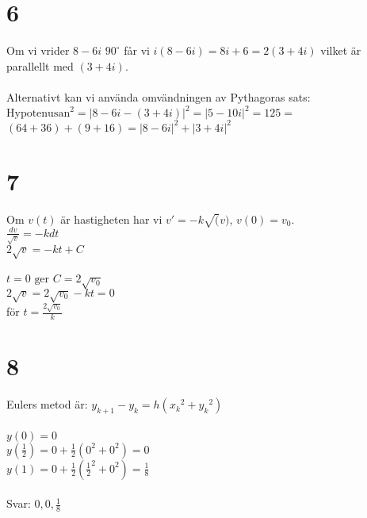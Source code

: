 \documentclass{article}
\begin{document}
\section*{6}
Om vi vrider $8-6i$ $90^{\circ}$ får vi $i(8-6i) = 8i+6 = 2(3+4i)$ vilket är 
parallellt med $(3+4i)$.\\\\
\noindent
Alternativt kan vi använda omvändningen av Pythagoras sats:\\
$\text{Hypotenusan}^2 = |8-6i - (3+4i)|^2 = |5-10i|^2 = 125 = $\\
$(64+36) + (9+16) = |8-6i|^2 + |3+4i|^2$

\section*{7}
Om $v(t)$ är hastigheten har vi $v' = -k \sqrt(v)$, $v(0) = v_0$.\\
$\frac{dv}{\sqrt{v}} = -k dt$\\
$2 \sqrt{v} = -kt + C$\\\\
$t=0 \text{ ger } C = 2\sqrt{v_0}$\\
$2\sqrt{v} = 2\sqrt{v_0} - kt = 0$\\
för $ t = \frac{2\sqrt{v_0}}{k}$\\

\section*{8}
Eulers metod är: $y_{k+1} - y_k = h({x_k}^2 + {y_k}^2)$\\\\
$y(0) = 0$\\
$y(\frac{1}{2}) = 0 + \frac{1}{2}(0^2 + 0^2) = 0$\\
$y(1) = 0 + \frac{1}{2}({\frac{1}{2}}^2 + 0^2) = \frac{1}{8}$\\\\
Svar: $0, 0, \frac{1}{8}$


\end{document}
